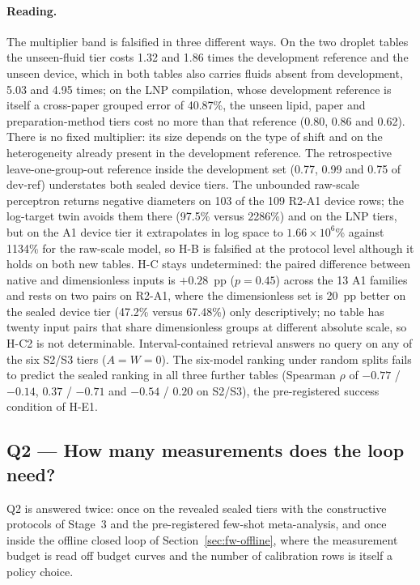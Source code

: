 \documentclass[11pt,a4paper]{article}
\begin{document}
\paragraph{Reading.} The multiplier band is falsified in three different
ways. On the two droplet tables the unseen-fluid tier costs 1.32 and 1.86
times the development reference and the unseen device, which in both tables
also carries fluids absent from development, 5.03 and 4.95 times; on the LNP
compilation, whose development reference is itself a cross-paper grouped
error of 40.87\%, the unseen lipid, paper and preparation-method tiers cost
no more than that reference (0.80, 0.86 and 0.62). There is no fixed
multiplier: its size depends on the type of shift and on the heterogeneity
already present in the development reference. The retrospective
leave-one-group-out reference inside the development set (0.77, 0.99 and
0.75 of dev-ref) understates both sealed device tiers. The unbounded
raw-scale perceptron returns negative diameters on 103 of the 109 R2-A1
device rows; the log-target twin avoids them there (97.5\% versus 2286\%)
and on the LNP tiers, but on the A1 device tier it extrapolates in log space
to $1.66\times10^{6}$\% against 1134\% for the raw-scale model, so H-B is
falsified at the protocol level although it holds on both new tables. H-C
stays undetermined: the paired difference between native and dimensionless
inputs is $+0.28$~pp ($p=0.45$) across the 13 A1 families and rests on two
pairs on R2-A1, where the dimensionless set is 20~pp better on the sealed
device tier (47.2\% versus 67.48\%) only descriptively; no table has twenty
input pairs that share dimensionless groups at different absolute scale, so
\mbox{H-C2} is not determinable. Interval-contained retrieval answers no query on any
of the six S2/S3 tiers ($A=W=0$). The six-model ranking under random splits
fails to predict the sealed ranking in all three further tables (Spearman $\rho$ of
$-0.77$ / $-0.14$, $0.37$ / $-0.71$ and $-0.54$ / $0.20$ on S2/S3), the
pre-registered success condition of \mbox{H-E1}.

\subsection{Q2 --- How many measurements does the loop need?}
\label{sec:q2}
Q2 is answered twice: once on the revealed sealed tiers with the constructive
protocols of Stage~3 and the pre-registered few-shot meta-analysis, and once
inside the offline closed loop of Section~\ref{sec:fw-offline}, where the
measurement budget is read off budget curves and the number of calibration
rows is itself a policy choice.
\end{document}
